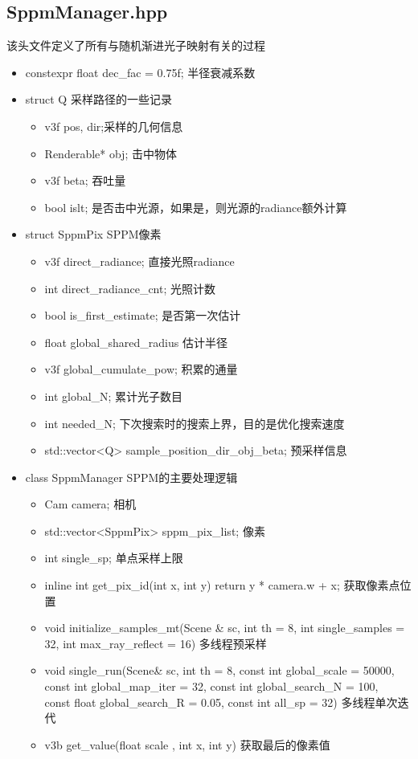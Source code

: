 \documentclass[12pt]{article}
\begin{document}
\subsection{SppmManager.hpp}
该头文件定义了所有与随机渐进光子映射有关的过程
\begin{itemize}
    \item constexpr float dec\_fac = 0.75f; 半径衰减系数
    \item struct Q 采样路径的一些记录
    \begin{itemize}
        \item v3f pos, dir;采样的几何信息
        \item Renderable* obj; 击中物体
        \item v3f beta; 吞吐量
        \item bool islt; 是否击中光源，如果是，则光源的radiance额外计算
    \end{itemize}
    \item struct SppmPix SPPM像素 
    \begin{itemize}
        \item v3f direct\_radiance; 直接光照radiance
        \item int direct\_radiance\_cnt; 光照计数
        \item bool is\_first\_estimate; 是否第一次估计
        \item float global\_shared\_radius 估计半径
        \item v3f global\_cumulate\_pow; 积累的通量
        \item int global\_N; 累计光子数目
        \item int needed\_N; 下次搜索时的搜索上界，目的是优化搜索速度
        \item std::vector<Q> sample\_position\_dir\_obj\_beta;  预采样信息
    \end{itemize}   
    \item class SppmManager SPPM的主要处理逻辑
    \begin{itemize}
        \item Cam camera; 相机
        \item std::vector<SppmPix> sppm\_pix\_list; 像素
        \item int single\_sp; 单点采样上限
        \item inline int get\_pix\_id(int x, int y) { return y * camera.w + x; } 获取像素点位置
        \item void initialize\_samples\_mt(Scene \& sc, int th = 8, int single\_samples = 32, int max\_ray\_reflect = 16) 多线程预采样
        \item void single\_run(Scene\& sc, int th = 8,
              const int global\_scale = 50000,\\
              const int global\_map\_iter = 32,
              const int global\_search\_N = 100,\\
              const float global\_search\_R = 0.05,
              const int all\_sp = 32)
              多线程单次迭代
        \item v3b get\_value(float scale , int x, int y) 获取最后的像素值
      
    \end{itemize}
\end{itemize}
\end{document}

